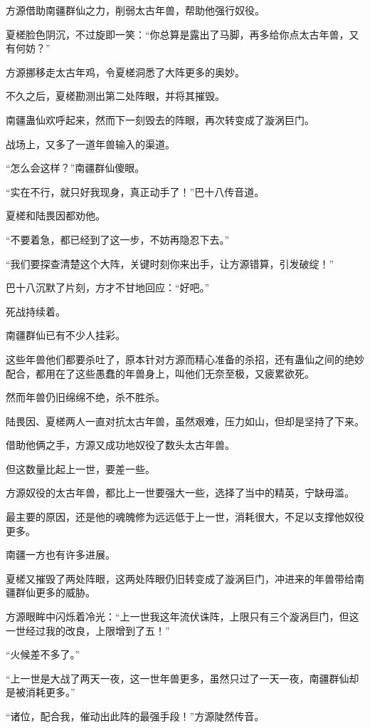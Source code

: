 \begin{this_body}
方源借助南疆群仙之力，削弱太古年兽，帮助他强行奴役。

夏槎脸色阴沉，不过旋即一笑：“你总算是露出了马脚，再多给你点太古年兽，又有何妨？”

方源挪移走太古年鸡，令夏槎洞悉了大阵更多的奥妙。

不久之后，夏槎勘测出第二处阵眼，并将其摧毁。

南疆蛊仙欢呼起来，然而下一刻毁去的阵眼，再次转变成了漩涡巨门。

战场上，又多了一道年兽输入的渠道。

“怎么会这样？”南疆群仙傻眼。

“实在不行，就只好我现身，真正动手了！”巴十八传音道。

夏槎和陆畏因都劝他。

“不要着急，都已经到了这一步，不妨再隐忍下去。”

“我们要探查清楚这个大阵，关键时刻你来出手，让方源错算，引发破绽！”

巴十八沉默了片刻，方才不甘地回应：“好吧。”

死战持续着。

南疆群仙已有不少人挂彩。

这些年兽他们都要杀吐了，原本针对方源而精心准备的杀招，还有蛊仙之间的绝妙配合，都用在了这些愚蠢的年兽身上，叫他们无奈至极，又疲累欲死。

然而年兽仍旧绵绵不绝，杀不胜杀。

陆畏因、夏槎两人一直对抗太古年兽，虽然艰难，压力如山，但却是坚持了下来。

借助他俩之手，方源又成功地奴役了数头太古年兽。

但这数量比起上一世，要差一些。

方源奴役的太古年兽，都比上一世要强大一些，选择了当中的精英，宁缺毋滥。

最主要的原因，还是他的魂魄修为远远低于上一世，消耗很大，不足以支撑他奴役更多。

南疆一方也有许多进展。

夏槎又摧毁了两处阵眼，这两处阵眼仍旧转变成了漩涡巨门，冲进来的年兽带给南疆群仙更多的威胁。

方源眼眸中闪烁着冷光：“上一世我这年流伏诛阵，上限只有三个漩涡巨门，但这一世经过我的改良，上限增到了五！”

“火候差不多了。”

“上一世是大战了两天一夜，这一世年兽更多，虽然只过了一天一夜，南疆群仙却是被消耗更多。”

“诸位，配合我，催动出此阵的最强手段！”方源陡然传音。

\end{this_body}

